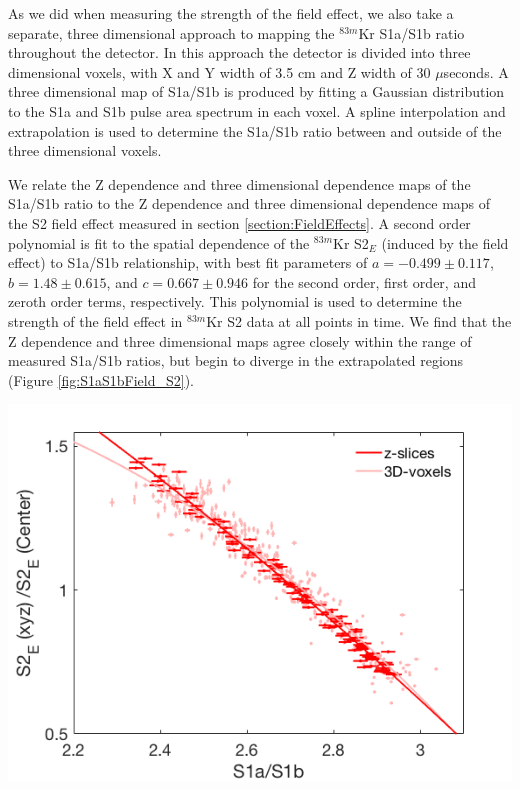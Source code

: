 As we did when measuring the strength of the field effect, we also take a separate, three dimensional approach to mapping the $^{83m}$Kr S1a/S1b ratio throughout the detector. In this approach the detector is divided into three dimensional voxels, with X and Y width of 3.5 cm and Z width of 30 $\mu$seconds.  A three dimensional map of S1a/S1b is produced by fitting a Gaussian distribution to the S1a and S1b pulse area spectrum in each voxel.  A spline interpolation and extrapolation is used to determine the S1a/S1b ratio between and outside of the three dimensional voxels.

We relate the Z dependence and three dimensional dependence maps of the S1a/S1b ratio to the Z dependence and three dimensional dependence maps of the S2 field effect measured in section \ref{section:FieldEffects}.  A second order polynomial is fit to the spatial dependence of the $^{83m}$Kr S2$_E$ (induced by the field effect) to S1a/S1b relationship, with best fit parameters of $a=-0.499 \pm 0.117$,$b=1.48 \pm 0.615$, and $c=0.667 \pm 0.946$ for the second order, first order, and zeroth order terms, respectively. This polynomial is used to determine the strength of the field effect in $^{83m}$Kr S2 data at all points in time.  We find that the Z dependence and three dimensional maps agree closely within the range of measured S1a/S1b ratios, but begin to diverge in the extrapolated regions (Figure \ref{fig:S1aS1bField_S2}). 

\begin{center}
\includegraphics[scale=0.4]{figures/S1aS1bvField_ZDep_3D_S2Only.png}
 \label{fig:S1aS1bField_S2}
\end{center}

